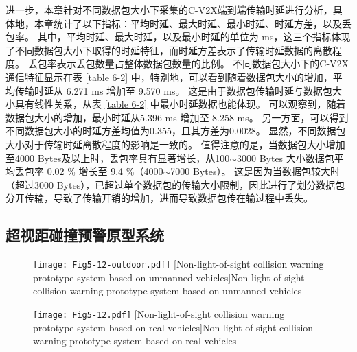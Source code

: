 进一步，本章针对不同数据包大小下采集的C-V2X端到端传输时延进行分析，具体地，本章统计了以下指标：平均时延、最大时延、最小时延、时延方差，以及丢包率。
其中，平均时延、最大时延，以及最小时延的单位为 ms，这三个指标体现了不同数据包大小下取得的时延特征，而时延方差表示了传输时延数据的离散程度。
丢包率表示丢包数量占整体数据包数量的比例。
不同数据包大小下的C-V2X通信特征显示在表 \ref{table 6-2} 中，特别地，可以看到随着数据包大小的增加，平均传输时延从 6.271 ms 增加至 9.570 ms。
这是由于数据包传输时延与数据包大小具有线性关系，从表 \ref{table 6-2} 中最小时延数据也能体现。
可以观察到，随着数据包大小的增加，最小时延从5.396 ms 增加至 8.258 ms。
另一方面，可以得到不同数据包大小的时延方差均值为0.355，且其方差为0.0028。
显然，不同数据包大小对于传输时延离散程度的影响是一致的。
值得注意的是，当数据包大小增加至4000 Bytes及以上时，丢包率具有显著增长，从100$\sim$3000 Bytes 大小数据包平均丢包率 0.02 \% 增长至 9.4 \%（4000$\sim$7000 Bytes）。
这是因为当数据包较大时（超过3000 Bytes），已超过单个数据包的传输大小限制，因此进行了划分数据包分开传输，导致了传输开销的增加，进而导致数据包传在输过程中丢失。

\subsection{超视距碰撞预警原型系统}


\begin{figure}[h]
\centering
  \texttt{[image: Fig5-12-outdoor.pdf]}
  [Non-light-of-sight collision warning prototype system based on unmanned vehicles]{Non-light-of-sight collision warning prototype system based on unmanned vehicles}
  \label{fig 5-11}
\end{figure}


\begin{figure}[h] 
	\centering
	\texttt{[image: Fig5-12.pdf]}
	[Non-light-of-sight collision warning prototype system based on real vehicles]{Non-light-of-sight collision warning prototype system based on real vehicles}
	\label{fig 5-12}
\end{figure}

